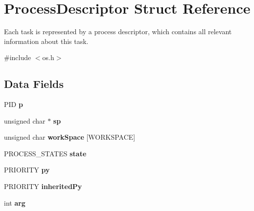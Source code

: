 \hypertarget{structProcessDescriptor}{}\section{Process\+Descriptor Struct Reference}
\label{structProcessDescriptor}


Each task is represented by a process descriptor, which contains all relevant information about this task.  




{\ttfamily \#include $<$os.\+h$>$}

\subsection*{Data Fields}
\begin{DoxyCompactItemize}
\item 
\hypertarget{structProcessDescriptor_aee4a91bb7cc21ee5a0d58f7cac98a6f9}{}P\+I\+D {\bfseries p}\label{structProcessDescriptor_aee4a91bb7cc21ee5a0d58f7cac98a6f9}

\item 
\hypertarget{structProcessDescriptor_abc44319d5a3c44b286df35802151f44b}{}unsigned char $\ast$ {\bfseries sp}\label{structProcessDescriptor_abc44319d5a3c44b286df35802151f44b}

\item 
\hypertarget{structProcessDescriptor_a0a81ca22e5c459395646b76e87c5f30f}{}unsigned char {\bfseries work\+Space} \mbox{[}W\+O\+R\+K\+S\+P\+A\+C\+E\mbox{]}\label{structProcessDescriptor_a0a81ca22e5c459395646b76e87c5f30f}

\item 
\hypertarget{structProcessDescriptor_a71624b9d00014f6d4083cca664e95ff6}{}P\+R\+O\+C\+E\+S\+S\+\_\+\+S\+T\+A\+T\+E\+S {\bfseries state}\label{structProcessDescriptor_a71624b9d00014f6d4083cca664e95ff6}

\item 
\hypertarget{structProcessDescriptor_a2401cd30bb7e3958b1933cc187023810}{}P\+R\+I\+O\+R\+I\+T\+Y {\bfseries py}\label{structProcessDescriptor_a2401cd30bb7e3958b1933cc187023810}

\item 
\hypertarget{structProcessDescriptor_a48ce1a325fc6c4167b1b2a37de9a7c00}{}P\+R\+I\+O\+R\+I\+T\+Y {\bfseries inherited\+Py}\label{structProcessDescriptor_a48ce1a325fc6c4167b1b2a37de9a7c00}

\item 
\hypertarget{structProcessDescriptor_aaa33dc59470fc5df86bfa102044042fa}{}int {\bfseries arg}\label{structProcessDescriptor_aaa33dc59470fc5df86bfa102044042fa}


\end{DoxyCompactItemize}

